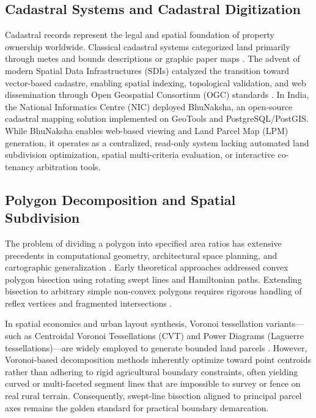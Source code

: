 \documentclass[conference]{IEEEtran}
\begin{document}
\subsection{Cadastral Systems and Cadastral Digitization}
Cadastral records represent the legal and spatial foundation of property ownership worldwide. Classical cadastral systems categorized land primarily through metes and bounds descriptions or graphic paper maps \cite{dale1999cadastral}. The advent of modern Spatial Data Infrastructures (SDIs) catalyzed the transition toward vector-based cadastre, enabling spatial indexing, topological validation, and web dissemination through Open Geospatial Consortium (OGC) standards \cite{rajabifard2006spatially}. In India, the National Informatics Centre (NIC) deployed BhuNaksha, an open-source cadastral mapping solution implemented on GeoTools and PostgreSQL/PostGIS. While BhuNaksha enables web-based viewing and Land Parcel Map (LPM) generation, it operates as a centralized, read-only system lacking automated land subdivision optimization, spatial multi-criteria evaluation, or interactive co-tenancy arbitration tools.

\subsection{Polygon Decomposition and Spatial Subdivision}
The problem of dividing a polygon into specified area ratios has extensive precedents in computational geometry, architectural space planning, and cartographic generalization \cite{de2000computational}. Early theoretical approaches addressed convex polygon bisection using rotating swept lines and Hamiltonian paths. Extending bisection to arbitrary simple non-convex polygons requires rigorous handling of reflex vertices and fragmented intersections \cite{lingas1982convex}. 

In spatial economics and urban layout synthesis, Voronoi tessellation variants---such as Centroidal Voronoi Tessellations (CVT) and Power Diagrams (Laguerre tessellations)---are widely employed to generate bounded land parcels \cite{araujo2014automated}. However, Voronoi-based decomposition methods inherently optimize toward point centroids rather than adhering to rigid agricultural boundary constraints, often yielding curved or multi-faceted segment lines that are impossible to survey or fence on real rural terrain. Consequently, swept-line bisection aligned to principal parcel axes remains the golden standard for practical boundary demarcation.
\end{document}
